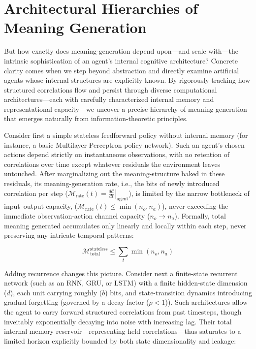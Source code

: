 \section{Architectural Hierarchies of Meaning Generation}

But how exactly does meaning-generation depend upon---and scale with---the intrinsic sophistication of an agent's internal cognitive architecture? Concrete clarity comes when we step beyond abstraction and directly examine artificial agents whose internal structures are explicitly known. By rigorously tracking how structured correlations flow and persist through diverse computational architectures---each with carefully characterized internal memory and representational capacity---we uncover a precise hierarchy of meaning-generation that emerges naturally from information-theoretic principles.

Consider first a simple stateless feedforward policy without internal memory (for instance, a basic Multilayer Perceptron policy network). Such an agent's chosen actions depend strictly on instantaneous observations, with no retention of correlations over time except whatever residuals the environment leaves untouched. After marginalizing out the meaning-structure baked in these residuals, its meaning-generation rate, i.e., the bits of newly introduced correlation per step ($\mathcal{M}_\text{rate}(t) = \left.\frac{d\mathcal{C}}{dt}\right\vert_{\text{agent}}$), is limited by the narrow bottleneck of input--output capacity, ($\mathcal{M}_\text{rate}(t) \leq \min(n_o, n_a)$), never exceeding the immediate observation-action channel capacity ($n_o \rightarrow n_a$). Formally, total meaning generated accumulates only linearly and locally within each step, never preserving any intricate temporal patterns:

\begin{equation*}
\mathcal{M}_{\text{total}}^{\text{stateless}} \leq \sum_t \min(n_o, n_a)
\end{equation*}

Adding recurrence changes this picture. Consider next a finite-state recurrent network (such as an RNN, GRU, or LSTM) with a finite hidden-state dimension ($d$), each unit carrying roughly ($b$) bits, and state-transition dynamics introducing gradual forgetting (governed by a decay factor ($\rho < 1$)). Such architectures allow the agent to carry forward structured correlations from past timesteps, though inveitably exponentially decaying into noise with increasing lag. Their total internal memory reservoir---representing held correlations---thus saturates to a limited horizon explicitly bounded by both state dimensionality and leakage:

